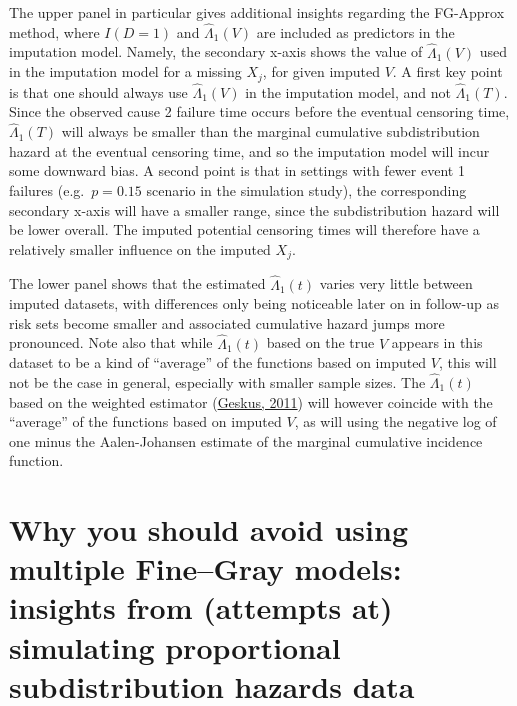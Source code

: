 \documentclass[
  letterpaper,
  DIV=11,
  numbers=noendperiod]{scrreprt}
\begin{document}
The upper panel in particular gives additional insights regarding the
FG-Approx method, where \(I(D = 1)\) and \(\hat{\Lambda}_1(V)\) are
included as predictors in the imputation model. Namely, the secondary
x-axis shows the value of \(\hat{\Lambda}_1(V)\) used in the imputation
model for a missing \(X_j\), for given imputed \(V\). A first key point
is that one should always use \(\hat{\Lambda}_1(V)\) in the imputation
model, and not \(\hat{\Lambda}_1(T)\). Since the observed cause 2
failure time occurs before the eventual censoring time,
\(\hat{\Lambda}_1(T)\) will always be smaller than the marginal
cumulative subdistribution hazard at the eventual censoring time, and so
the imputation model will incur some downward bias. A second point is
that in settings with fewer event 1 failures (e.g.~\(p = 0.15\) scenario
in the simulation study), the corresponding secondary x-axis will have a
smaller range, since the subdistribution hazard will be lower overall.
The imputed potential censoring times will therefore have a relatively
smaller influence on the imputed \(X_j\).

The lower panel shows that the estimated \(\hat{\Lambda}_1(t)\) varies
very little between imputed datasets, with differences only being
noticeable later on in follow-up as risk sets become smaller and
associated cumulative hazard jumps more pronounced. Note also that while
\(\hat{\Lambda}_1(t)\) based on the true \(V\) appears in this dataset
to be a kind of ``average'' of the functions based on imputed \(V\),
this will not be the case in general, especially with smaller sample
sizes. The \(\hat{\Lambda}_1(t)\) based on the weighted estimator
(\protect\hyperlink{ref-geskusCauseSpecificCumulativeIncidence2011}{Geskus,
2011}) will however coincide with the ``average'' of the functions based
on imputed \(V\), as will using the negative log of one minus the
Aalen-Johansen estimate of the marginal cumulative incidence function.


\hypertarget{why-you-should-avoid-using-multiple-finegray-models-insights-from-attempts-at-simulating-proportional-subdistribution-hazards-data}{%
\chapter{Why you should avoid using multiple Fine--Gray models: insights
from (attempts at) simulating proportional subdistribution hazards
data}\label{why-you-should-avoid-using-multiple-finegray-models-insights-from-attempts-at-simulating-proportional-subdistribution-hazards-data}}
\end{document}
